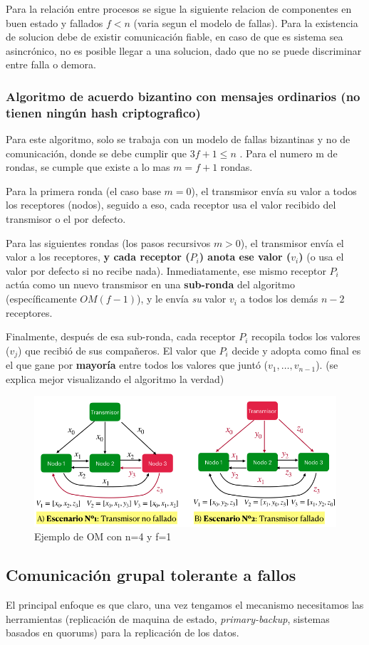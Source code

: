 Para la relación entre procesos se sigue la siguiente relacion de componentes en buen estado y fallados $f<n$ (varia segun el modelo de fallas). Para la existencia de solucion debe de existir comunicación fiable, en caso de que es sistema sea asincrónico, no es posible llegar a una solucion, dado que no se puede discriminar entre falla o demora.

\subsubsection{Algoritmo de acuerdo bizantino con mensajes ordinarios (no tienen ningún hash criptografico)}

Para este algoritmo, solo se trabaja con un modelo de fallas bizantinas y no de comunicación, donde se debe cumplir que $3f+1\leq n$ . Para el numero m de rondas, se cumple que existe a lo mas $m= f+1$ rondas.

Para la primera ronda (el caso base $m = 0$), el transmisor envía su valor a todos los receptores (nodos), seguido a eso, cada receptor usa el valor recibido del transmisor o el por defecto.

Para las siguientes rondas (los pasos recursivos $m > 0$), el transmisor envía el valor a los receptores, \textbf{y cada receptor ($P_i$) anota ese valor ($v_i$)} (o usa el valor por defecto si no recibe nada). Inmediatamente, ese mismo receptor $P_i$ actúa como un nuevo transmisor en una \textbf{sub-ronda} del algoritmo (específicamente $OM(f-1)$), y le envía \textit{su} valor $v_i$ a todos los demás $n-2$ receptores.

Finalmente, después de esa sub-ronda, cada receptor $P_i$ recopila todos los valores ($v_j$) que recibió de sus compañeros. El valor que $P_i$ decide y adopta como final es el que gane por \textbf{mayoría} entre todos los valores que juntó ($v_1, \dots, v_{n-1}$). (se explica mejor visualizando el algoritmo la verdad)

\begin{figure}[H]
    \centering
    \includegraphics[width=0.4\linewidth]{img/ordinario.png}
    \caption{Ejemplo de OM con n=4 y f=1}\label{fig:1761838884075}
\end{figure}

\subsection{Comunicación grupal tolerante a fallos}
El principal enfoque es que claro, una vez tengamos el mecanismo necesitamos las herramientas (replicación de maquina de estado, \textit{primary-backup}, sistemas basados en quorums) para la replicación de los datos.

